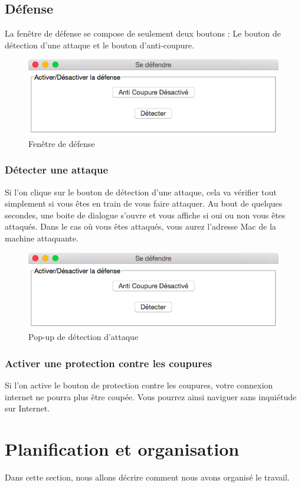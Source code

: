 \documentclass[11pt]{article}
\begin{document}
\subsection{Défense}
La fenêtre de défense se compose de seulement deux boutons : Le bouton de détection d'une attaque et le bouton d'anti-coupure.
\begin{figure}[!h]
\centering
\includegraphics[scale=0.6]{./Captures/defense.png}
\caption{Fenêtre de défense}
\end{figure}
\subsubsection{Détecter une attaque}
Si l'on clique sur le bouton de détection d'une attaque, cela va vérifier tout simplement si vous êtes en train de vous faire attaquer. Au bout de quelques secondes, une boite de dialogue s'ouvre et vous affiche si oui ou non vous êtes attaqués. Dans le cas où vous êtes attaqués, vous aurez l'adresse Mac de la machine attaquante.
\begin{figure}[!h]
\centering
\includegraphics[scale=0.6]{./Captures/defense.png}
\caption{Pop-up de détection d'attaque}
\end{figure}
\subsubsection{Activer une protection contre les coupures}
Si l'on active le bouton de protection contre les coupures, votre connexion internet ne pourra plus être coupée. Vous pourrez ainsi naviguer sans inquiétude sur Internet.




\section{Planification et organisation}
Dans cette section, nous allons décrire comment nous avons organisé le travail.
\end{document}

